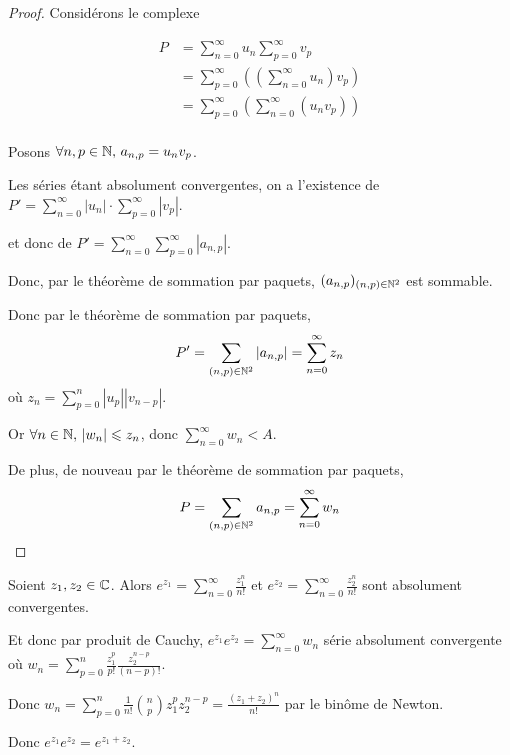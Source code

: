 
\begin{proof}
    Considérons le complexe 

    \begin{align*}
        P & = \sum_{n = 0 }^{\infty } u_n \sum_{p = 0 }^{\infty } v_p \\
            & = \sum_{p = 0 }^{\infty } \left( \left( \sum_{n = 0}^{\infty } u_n \right) v_p \right) \\
            & = \sum_{p = 0 }^{\infty } \left( \sum_{n = 0}^{\infty } (u_n v_p) \right) \\ 
    \end{align*}

    Posons $\forall n, p \in \mathbb{N}, \, a_{n, p} = u_n v_p$.

    Les séries étant absolument convergentes, on a l'existence de 
    $P' = \displaystyle \sum_{n = 0 }^{\infty } |u_n| \cdot \sum_{p = 0 }^{\infty } |v_p|$.

    et donc de $P' = \displaystyle \sum_{n = 0 }^{\infty } \sum_{p = 0 }^{\infty } |a_{n, p}|$.

    Donc, par le théorème de sommation par paquets, $(a_{n, p})_{(n, p) \in \mathbb{N}^2}$ est sommable. 

    Donc par le théorème de sommation par paquets, 
    $$P' = \sum_{(n, p) \in \mathbb{N}^2} |a_{n, p}| = \sum_{n = 0 }^{\infty } z_n$$
    où $\displaystyle z_n = \sum_{p = 0}^n |u_p| |v_{n - p}|$.

    Or $\forall n \in \mathbb{N}, \, |w_n| \leqslant z_n$, donc $\displaystyle \sum_{n = 0 }^{\infty } w_n < A$. 

    De plus, de nouveau par le théorème de sommation par paquets,
    $$P = \sum_{(n, p) \in \mathbb{N}^2} a_{n, p} = \sum_{n = 0 }^{\infty } w_n$$
\end{proof}

\begin{exemple}
    Soient $z_1, z_2 \in \mathbb{C}$. Alors 
    $\displaystyle e^{z_1} = \sum_{n = 0 }^{\infty } \frac{z_1^n}{n!}$ et
    $\displaystyle e^{z_2} = \sum_{n = 0 }^{\infty } \frac{z_2^n}{n!}$ sont absolument convergentes.

    Et donc par produit de Cauchy, $\displaystyle e^{z_1} e^{z_2} = \sum_{n = 0 }^{\infty } w_n$ 
    série absolument convergente où $\displaystyle w_n = \sum_{ p = 0}^n \frac{z_1^p}{p!} \frac{z_2^{n - p}}{(n - p)!}$.

    Donc $w_n = \displaystyle \sum_{p = 0 }^{n } \frac{1}{n!} \binom n p z_1^p z_2^{n - p} = \frac{(z_1 + z_2)^n}{n!}$ 
    par le binôme de Newton.

    Donc $\displaystyle e^{z_1} e^{z_2} = e^{z_1 + z_2}$.

\end{exemple}

